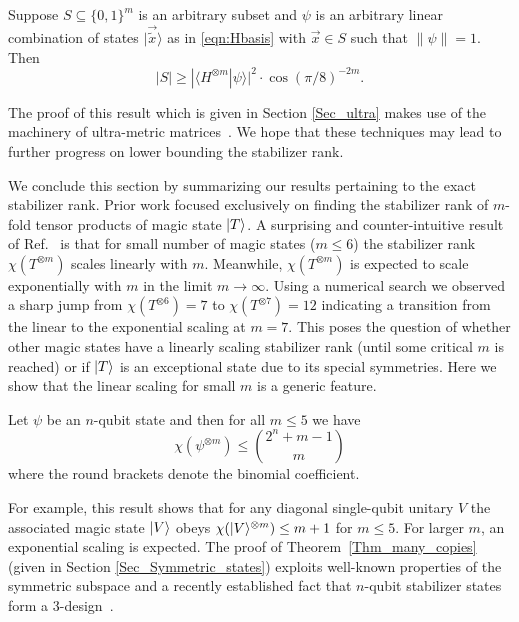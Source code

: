 \begin{prop}
\label{prop:lower_bound}
Suppose $S\subseteq \{0,1\}^m$ is an arbitrary subset
and $\psi$ is an arbitrary linear combination of states
$|\vec{\tilde{x}}\rangle$ as in \eqref{eqn:Hbasis} with $\vec{x}\in S$ such that $\|\psi\|=1$.  Then 
\begin{equation}
\label{eq1ultra}
|S|\ge |\langle H^{\otimes m}|\psi\rangle |^2 \cdot \cos{(\pi/8)}^{-2m}.
\end{equation}
\end{prop}
The proof of this result which is given in Section \ref{Sec_ultra} makes use of the machinery of ultra-metric  matrices~\cite{MMM,NabenVarga}. We hope that these techniques may lead to further progress   on lower bounding the stabilizer rank.



We conclude this section by summarizing our results pertaining to the exact stabilizer rank.
Prior work focused exclusively on finding the stabilizer rank of $m$-fold tensor products
of magic state $|T\rangle$.
A surprising and counter-intuitive result of Ref.~\cite{Bravyi16stabRank}
is that  for small number of magic states ($m\le 6$) the stabilizer rank $\chi(T^{\otimes m})$
scales linearly with $m$. Meanwhile,   $\chi(T^{\otimes m})$ is expected to 
scale exponentially with $m$ in the  limit $m\to \infty$.
Using a numerical search we observed a sharp jump from $\chi(T^{\otimes 6})=7$
to $\chi(T^{\otimes 7})=12$ indicating a transition from the linear to the exponential scaling
at $m=7$. This poses the question of whether other magic states have a linearly scaling stabilizer rank 
(until some critical $m$ is reached) or if $|T\rangle$ is an exceptional state due to its special symmetries.
Here we show that the linear scaling for small $m$ is a generic feature.  
\begin{theorem}
	\label{Thm_many_copies}
	Let $\psi$ be an $n$-qubit state and then for all $m \leq 5$ we have
	\begin{equation}
	\chi( \psi^{\otimes m} ) \leq \binom{2^n + m -1}{m}
	\end{equation}
	where the round brackets denote the binomial coefficient.
\end{theorem}
For example, this result shows that for any diagonal single-qubit unitary $V$ the associated magic state $\vert V\rangle$
obeys $\chi(\vert V\rangle^{\otimes m})\le m+1$ for $m \leq 5$.  For larger $m$, an exponential scaling is expected.  
The proof of Theorem~\ref{Thm_many_copies} (given in Section \ref{Sec_Symmetric_states}) exploits well-known properties of the symmetric subspace and a recently established fact that $n$-qubit stabilizer states form a 3-design~\cite{Webb16,kueng15}. 

